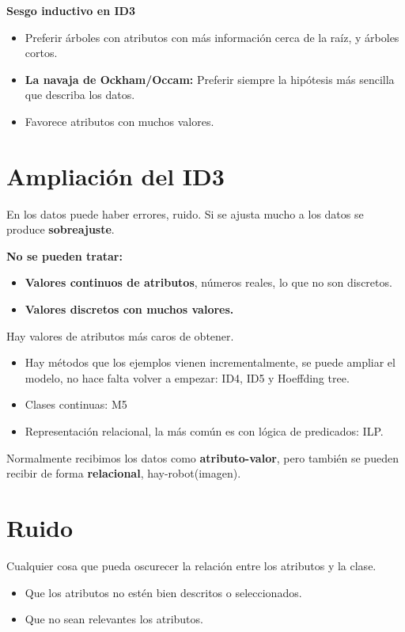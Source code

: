 \documentclass[12pt, twoside, openright]{report} %
\begin{document}
\textbf{Sesgo inductivo en ID3}

\begin{itemize}
	\item Preferir árboles con atributos con más información cerca de la raíz, y árboles cortos.
	\item \textbf{La navaja de Ockham/Occam:} Preferir siempre la hipótesis más sencilla que describa los datos.
	\item Favorece atributos con muchos valores.
\end{itemize}

\section{Ampliación del ID3}

En los datos puede haber errores, ruido. Si se ajusta mucho a los datos se produce \textbf{sobreajuste}.

\textbf{No se pueden tratar:}

\begin{itemize}
	\item \textbf{Valores continuos de atributos}, números reales, lo que no son discretos.
	\item \textbf{Valores discretos con muchos valores.}
\end{itemize}

Hay valores de atributos más caros de obtener.

\begin{itemize}
	\item Hay métodos que los ejemplos vienen incrementalmente, se puede ampliar el modelo, no hace falta volver a empezar: ID4, ID5 y Hoeffding tree.
	\item Clases continuas: M5
	\item Representación relacional, la más común es con lógica de predicados: ILP.
\end{itemize}

Normalmente recibimos los datos como \textbf{atributo-valor}, pero también se pueden recibir de forma \textbf{relacional}, hay-robot(imagen).

\section{Ruido}

Cualquier cosa que pueda oscurecer la relación entre los atributos y la clase.

\begin{itemize}
	\item Que los atributos no estén bien descritos o seleccionados.
	\item Que no sean relevantes los atributos.
\end{itemize}
\end{document}
